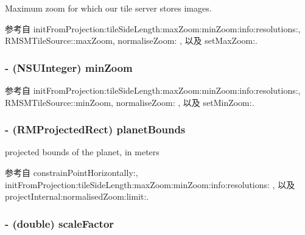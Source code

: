 Maximum zoom for which our tile server stores images. 



参考自 init\-From\-Projection\-:tile\-Side\-Length\-:max\-Zoom\-:min\-Zoom\-:info\-:resolutions\-:, R\-M\-S\-M\-Tile\-Source\-::max\-Zoom, normalise\-Zoom\-: , 以及 set\-Max\-Zoom\-:.

\hypertarget{interface_r_m_s_m_tile_projection_af52e70bac54d3c9c229f38850dfaa195}{
\subsubsection[{min\-Zoom}]{\setlength{\rightskip}{0pt plus 5cm}-\/ (N\-S\-U\-Integer) min\-Zoom\hspace{0.3cm}{\ttfamily [protected]}}}\label{interface_r_m_s_m_tile_projection_af52e70bac54d3c9c229f38850dfaa195}


参考自 init\-From\-Projection\-:tile\-Side\-Length\-:max\-Zoom\-:min\-Zoom\-:info\-:resolutions\-:, R\-M\-S\-M\-Tile\-Source\-::min\-Zoom, normalise\-Zoom\-: , 以及 set\-Min\-Zoom\-:.

\hypertarget{interface_r_m_s_m_tile_projection_a441495eb7464318f709e32b3ba889ab7}{
\subsubsection[{planet\-Bounds}]{\setlength{\rightskip}{0pt plus 5cm}-\/ ({\bf R\-M\-Projected\-Rect}) planet\-Bounds\hspace{0.3cm}{\ttfamily [protected]}}}\label{interface_r_m_s_m_tile_projection_a441495eb7464318f709e32b3ba889ab7}


projected bounds of the planet, in meters 



参考自 constrain\-Point\-Horizontally\-:, init\-From\-Projection\-:tile\-Side\-Length\-:max\-Zoom\-:min\-Zoom\-:info\-:resolutions\-: , 以及 project\-Internal\-:normalised\-Zoom\-:limit\-:.

\hypertarget{interface_r_m_s_m_tile_projection_ad254771d183309cf4caced68e589da2c}{
\subsubsection[{scale\-Factor}]{\setlength{\rightskip}{0pt plus 5cm}-\/ (double) scale\-Factor\hspace{0.3cm}{\ttfamily [protected]}}}\label{interface_r_m_s_m_tile_projection_ad254771d183309cf4caced68e589da2c}


